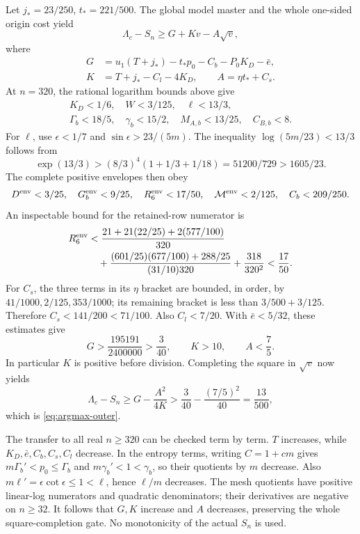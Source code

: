 Let $j_*=23/250$, $t_*=221/500$.  The global model master and the
whole one-sided origin cost yield
\[
 \Lambda_c-S_n\geq G+Kv-A\sqrt v,
\]
where
\begin{align}
 G&=u_1(T+j_*)-t_*p_0-C_b-P_0K_D-\bar e,\nonumber\\
 K&=T+j_*-C_l-4K_D,\qquad A=\eta t_*+C_s.
                                                        \label{eq:argmax-outer-gate}
\end{align}
At $n=320$, the rational logarithm bounds above give
\begin{gather*}
 K_D<1/6,\quad W<3/125,\quad\ell<13/3,\\
 \Gamma_b<18/5,\quad\gamma_b<15/2,
 \quad M_{A,b}<13/25,\quad C_{B,b}<8.
\end{gather*}
For $\ell$, use $\epsilon<1/7$ and $\sin\epsilon>23/(5m)$.
The inequality $\log(5m/23)<13/3$ follows from
\[
 \exp(13/3)>(8/3)^4(1+1/3+1/18)=51200/729>1605/23.
\]
The complete positive envelopes then obey
\[
 D^{\rm env}<3/25,\quad G_b^{\rm env}<9/25,
 \quad R_6^{\rm env}<17/50,\quad\mathcal M^{\rm env}<2/125,
 \quad C_b<209/250.
\]
An inspectable bound for the retained-row numerator is
\begin{align*}
 R_6^{\rm env}&<\frac{21+21(22/25)+2(577/100)}{320}\\
 &\quad+\frac{(601/25)(677/100)+288/25}{(31/10)320}
       +\frac{318}{320^2}<\frac{17}{50}.
\end{align*}
For $C_s$, the three terms in its $\eta$ bracket are bounded,
in order, by $41/1000,2/125,353/1000$; its remaining bracket is
less than $3/500+3/125$.  Therefore
$C_s<141/200<71/100$.  Also $C_l<7/20$.
With $\bar e<5/32$, these estimates give
\[
 G>\frac{195191}{2400000}>\frac3{40},\qquad K>10,
 \qquad A<\frac75.
\]
In particular $K$ is positive before division.  Completing the square
in $\sqrt v$ now yields
\[
 \Lambda_c-S_n\geq G-\frac{A^2}{4K}
       >\frac3{40}-\frac{(7/5)^2}{40}=\frac{13}{500},
\]
which is \eqref{eq:argmax-outer}.

The transfer to all real $n\geq320$ can be checked term by term.
$T$ increases, while $K_D,\bar e,C_b,C_s,C_l$ decrease.  In the
entropy terms, writing $C=1+cm$ gives
$m\Gamma_b'<p_0\leq\Gamma_b$ and
$m\gamma_b'<1<\gamma_b$, so their quotients by $m$ decrease.
Also $m\ell'=\epsilon\cot\epsilon\leq1<\ell$, hence $\ell/m$
decreases.  The mesh quotients have positive linear-log numerators and
quadratic denominators; their derivatives are negative on $n\geq32$.
It follows that $G,K$ increase and $A$ decreases, preserving the whole
square-completion gate.  No monotonicity of the actual $S_n$ is used.

